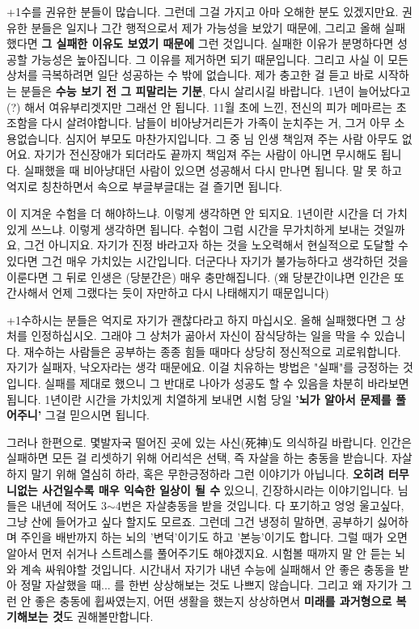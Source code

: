 +1수를 권유한 분들이 많습니다. 그런데 그걸 가지고 아마 오해한 분도 있겠지만요.
권유한 분들은 일지나 그간 행적으로서 제가 가능성을 보았기 때문에, 그리고 올해 실패했다면 \textbf{그 실패한 이유도 보였기 때문에} 그런 것입니다.
실패한 이유가 분명하다면 성공할 가능성은 높아집니다. 그 이유를 제거하면 되기 때문입니다.
그리고 사실 이 모든 상처를 극복하려면 일단 성공하는 수 밖에 없습니다.
제가 충고한 걸 듣고 바로 시작하는 분들은 \textbf{수능 보기 전 그 피말리는 기분}, 다시 살리시길 바랍니다.
1년이 늘어났다고(?) 해서 여유부리겟지만 그래선 안 됩니다. 11월 초에 느낀, 전신의 피가 메마르는 초조함을 다시 살려야합니다.
남들이 비아냥거리든가 가족이 눈치주는 거, 그거 아무 소용없습니다. 심지어 부모도 마찬가지입니다.
그 중 님 인생 책임져 주는 사람 아무도 없어요. 자기가 전신장애가 되더라도 끝까지 책임져 주는 사람이 아니면 무시해도 됩니다.
실패했을 때 비아냥대던 사람이 있으면 성공해서 다시 만나면 됩니다. 말 못 하고 억지로 칭찬하면서 속으로 부글부글대는 걸 즐기면 됩니다.
\vspace{5mm}

이 지겨운 수험을 더 해야하느냐. 이렇게 생각하면 안 되지요.
1년이란 시간을 더 가치있게 쓰느냐. 이렇게 생각하면 됩니다.
수험이 그럼 시간을 무가치하게 보내는 것일까요, 그건 아니지요.
자기가 진정 바라고자 하는 것을 노오력해서 현실적으로 도달할 수 있다면 그건 매우 가치있는 시간입니다.
더군다나 자기가 불가능하다고 생각하던 것을 이룬다면 그 뒤로 인생은 (당분간은) 매우 충만해집니다.
(왜 당분간이냐면 인간은 또 간사해서 언제 그랬다는 듯이 자만하고 다시 나태해지기 때문입니다)
\vspace{5mm}

+1수하시는 분들은 억지로 자기가 괜찮다라고 하지 마십시오.
올해 실패했다면 그 상처를 인정하십시오. 그래야 그 상처가 곪아서 자신이 잠식당하는 일을 막을 수 있습니다.
재수하는 사람들은 공부하는 종종 힘들 때마다 상당히 정신적으로 괴로워합니다. 자기가 실패자, 낙오자라는 생각 때문에요.
이걸 치유하는 방법은 "실패"를 긍정하는 것입니다. 실패를 제대로 했으니 그 반대로 나아가 성공도 할 수 있음을 차분히 바라보면 됩니다.
1년이란 시간을 가치있게 치열하게 보내면 시험 당일 \textbf{'뇌가 알아서 문제를 풀어주니'} 그걸 믿으시면 됩니다.
\vspace{5mm}

그러나 한편으로. 몇발자국 떨어진 곳에 있는 사신(死神)도 의식하길 바랍니다.
인간은 실패하면 모든 걸 리셋하기 위해 어리석은 선택, 즉 자살을 하는 충동을 받습니다.
자살하지 말기 위해 열심히 하라, 혹은 무한긍정하라 그런 이야기가 아닙니다.
\textbf{오히려 터무니없는 사건일수록 매우 익숙한 일상이 될 수} 있으니, 긴장하시라는 이야기입니다.
님들은 내년에 적어도 3$\sim$4번은 자살충동을 받을 것입니다. 다 포기하고 엉엉 울고싶다, 그냥 산에 들어가고 싶다 할지도 모르죠.
그런데 그건 냉정히 말하면, 공부하기 싫어하며 주인을 배반까지 하는 뇌의 '변덕'이기도 하고 '본능'이기도 합니다.
그럴 때가 오면 알아서 먼저 쉬거나 스트레스를 풀어주기도 해야겠지요. 시험볼 때까지 말 안 듣는 뇌와 계속 싸워야할 것입니다.
시간내서 자기가 내년 수능에 실패해서 안 좋은 충동을 받아 정말 자살했을 때... 를 한번 상상해보는 것도 나쁘지 않습니다.
그리고 왜 자기가 그런 안 좋은 충동에 휩싸였는지, 어떤 생활을 했는지 상상하면서 \textbf{미래를 과거형으로 복기해보는 것}도 권해볼만합니다.
\vspace{5mm}

